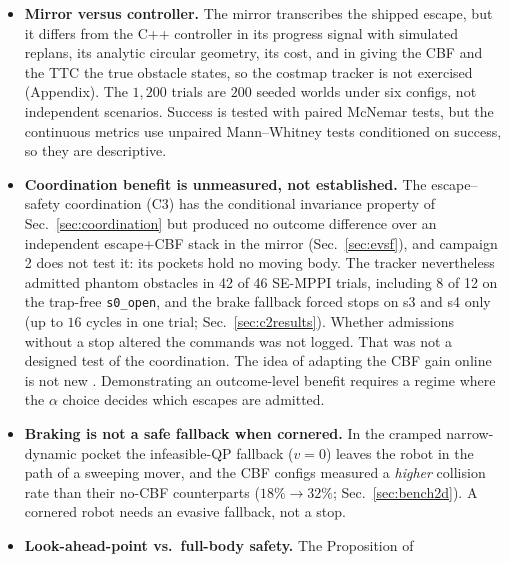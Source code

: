\documentclass[journal]{IEEEtran}
\begin{document}
\begin{itemize}
  set \texttt{se\_enforce\_rollout\_check} to false on a moving robot. Humble's
  distribution was not evaluated: every reported result comes from the Jazzy stack or the 2D mirror.
  The repository README records that the plugin builds on Humble behind a compile-time switch, that
  Humble's controller server never calls \texttt{reset()}, so a goal end does not clear the escape
  memory, and that the RoboStack Humble MPPI builds it checked roll out in the wrong direction.
\item \textbf{Mirror versus controller.} The mirror transcribes the shipped escape, but it differs
  from the C++ controller in its progress signal with simulated replans, its analytic circular
  geometry, its cost, and in giving the CBF and the TTC the true obstacle states, so the costmap tracker is
  not exercised (Appendix). The $1{,}200$ trials are $200$ seeded worlds under six configs, not independent
  scenarios. Success is tested with paired McNemar tests, but the continuous metrics use unpaired
  Mann--Whitney tests conditioned on success, so they are descriptive.
\item \textbf{Coordination benefit is unmeasured, not established.} The escape--safety
  coordination (C3) has the conditional invariance property of Sec.~\ref{sec:coordination} but
  produced no outcome difference over an independent escape+CBF stack in the mirror
  (Sec.~\ref{sec:evsf}), and campaign 2 does not test it: its pockets hold no moving body. The tracker
  nevertheless admitted phantom obstacles in 42 of 46 SE-MPPI trials, including 8 of 12 on the
  trap-free \texttt{s0\_open}, and the brake fallback forced stops on s3 and s4 only (up to $16$
  cycles in one trial; Sec.~\ref{sec:c2results}). Whether admissions without a stop altered the
  commands was not logged. That was not a designed test of the coordination. The idea of adapting the CBF gain online is not new
  \cite{kim_adaptive_cbf,br_mppi,rt_cbf}. Demonstrating an outcome-level benefit requires a
  regime where the $\alpha$ choice decides which escapes are admitted.
\item \textbf{Braking is not a safe fallback when cornered.} In the cramped narrow-dynamic pocket the
  infeasible-QP fallback ($v=0$) leaves the robot in the path of a sweeping mover, and the CBF configs
  measured a \emph{higher} collision rate than their no-CBF counterparts ($18\%\!\to\!32\%$;
  Sec.~\ref{sec:bench2d}). A cornered robot needs an evasive fallback, not a stop.
\item \textbf{Look-ahead-point vs.\ full-body safety.} The Proposition of

\end{itemize}
\end{document}
